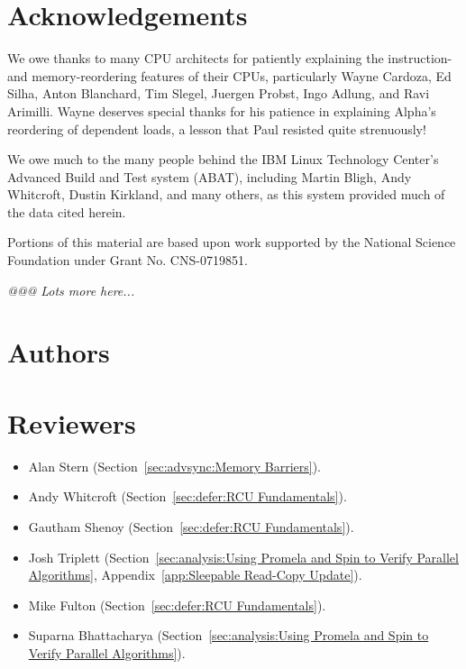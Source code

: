 
\section*{Acknowledgements}

We owe thanks to many CPU architects for patiently explaining the
instruction- and memory-reordering features of their CPUs, particularly
Wayne Cardoza, Ed Silha, Anton Blanchard, Tim Slegel, Juergen Probst,
Ingo Adlung, and Ravi Arimilli.
Wayne deserves special thanks for his patience in explaining Alpha's reordering
of dependent loads, a lesson that Paul resisted quite strenuously!

We owe much to the many people behind the IBM Linux Technology Center's
Advanced Build and Test system (ABAT), including Martin Bligh, Andy
Whitcroft, Dustin Kirkland, and many others, as this system provided much
of the data cited herein.

Portions of this material are based upon work supported by the National
Science Foundation under Grant No. CNS-0719851.

\emph{@@@ Lots more here...}

\section*{Authors}

\section*{Reviewers}

\begin{itemize}
\item	Alan Stern (Section~\ref{sec:advsync:Memory Barriers}).
\item	Andy Whitcroft (Section~\ref{sec:defer:RCU Fundamentals}).
\item	Gautham Shenoy (Section~\ref{sec:defer:RCU Fundamentals}).
\item	Josh Triplett
	(Section~\ref{sec:analysis:Using Promela and Spin to Verify Parallel Algorithms},
	Appendix~\ref{app:Sleepable Read-Copy Update}).
\item	Mike Fulton (Section~\ref{sec:defer:RCU Fundamentals}).
\item	Suparna Bhattacharya
	(Section~\ref{sec:analysis:Using Promela and Spin to Verify Parallel Algorithms}).
\end{itemize}
